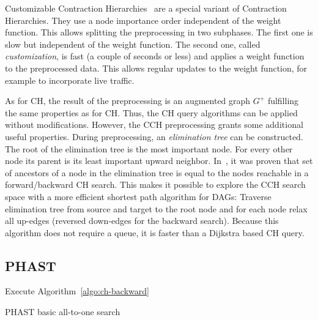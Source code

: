 \documentclass[manuscript,review]{acmart}
\begin{document}
Customizable Contraction Hierarchies~\cite{dsw-cch-15} are a special variant of Contraction Hierarchies.
They use a node importance order independent of the weight function.
This allows splitting the preprocessing in two subphases.
The first one is slow but independent of the weight function.
The second one, called \emph{customization}, is fast (a couple of seconds or less) and applies a weight function to the preprocessed data.
This allows regular updates to the weight function, for example to incorporate live traffic.

As for CH, the result of the preprocessing is an augmented graph $G^+$ fulfilling the same properties as for CH.
Thus, the CH query algorithms can be applied without modifications.
However, the CCH preprocessing grants some additional useful properties.
During preprocessing, an \emph{elimination tree} can be constructed.
The root of the elimination tree is the most important node.
For every other node its parent is its least important upward neighbor.
In~\cite{bcrw-s-16}, it was proven that set of ancestors of a node in the elimination tree is equal to the nodes reachable in a forward/backward CH search.
This makes it possible to explore the CCH search space with a more efficient shortest path algorithm for DAGs:
Traverse elimination tree from source and target to the root node and for each node relax all up-edges (reversed down-edges for the backward search).
Because this algorithm does not require a queue, it is faster than a Dijkstra based CH query.

\subsection{PHAST}

\begin{algorithm2e}
Execute Algorithm~\ref{algo:ch-backward}\;
\caption{PHAST basic all-to-one search}
\label{algo:phast}
\end{algorithm2e}
\end{document}
